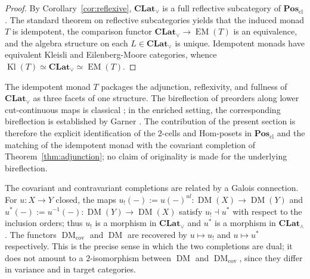\documentclass{amsart}
\theoremstyle{plain}
\theoremstyle{definition}
\theoremstyle{remark}
\DeclareMathOperator{\DM}{DM}
\DeclareMathOperator{\EM}{EM}
\DeclareMathOperator{\Kl}{Kl}
\begin{document}
\begin{proof}
By Corollary~\ref{cor:reflexive}, $\mathbf{CLat}_\vee$ is a full reflective subcategory of $\mathbf{Pos}_{\mathrm{cl}}$. The standard theorem on reflective subcategories \cite[\S IV.3]{borceux1994handbook} yields that the induced monad $T$ is idempotent, the comparison functor $\mathbf{CLat}_\vee\to\EM(T)$ is an equivalence, and the algebra structure on each $L\in\mathbf{CLat}_\vee$ is unique. Idempotent monads have equivalent Kleisli and Eilenberg-Moore categories, whence $\Kl(T)\simeq\mathbf{CLat}_\vee\simeq\EM(T)$.
\end{proof}


The idempotent monad $T$ packages the adjunction, reflexivity, and fullness of $\mathbf{CLat}_\vee$ as three facets of one structure. The bireflection of preorders along lower cut-continuous maps is classical \cite{bishop1978universal}; in the enriched setting, the corresponding bireflection is established by Garner \cite{garner2014topological}. The contribution of the present section is therefore the explicit identification of the $2$-cells and Hom-posets in $\mathbf{Pos}_{\mathrm{cl}}$ and the matching of the idempotent monad with the covariant completion of Theorem~\ref{thm:adjunction}; no claim of originality is made for the underlying bireflection.


The covariant and contravariant completions are related by a Galois connection. For $u\colon X\to Y$ closed, the maps $u_!(-):=u(-)^{ul}\colon\DM(X)\to\DM(Y)$ and $u^*(-):=u^{-1}(-)\colon\DM(Y)\to\DM(X)$ satisfy $u_!\dashv u^*$ with respect to the inclusion orders; thus $u_!$ is a morphism in $\mathbf{CLat}_\vee$ and $u^*$ is a morphism in $\mathbf{CLat}_\wedge$. The functors $\DM_{\mathrm{cov}}$ and $\DM$ are recovered by $u\mapsto u_!$ and $u\mapsto u^*$ respectively. This is the precise sense in which the two completions are dual; it does not amount to a $2$-isomorphism between $\DM$ and $\DM_{\mathrm{cov}}$, since they differ in variance and in target categories.





\end{document}
